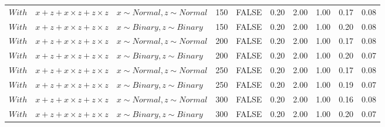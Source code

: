 \begin{longtable}{lllrlrrrrr}
  $With$ & $\textit{x} + \textit{z} + \textit{x} \times \textit{z} + \textit{z} \times \textit{z}$ & $\textit{x} \sim Normal , \textit{z} \sim Normal$ & 150 & FALSE & 0.20 & 2.00 & 1.00 & 0.17 & 0.08 \\ 
  $With$ & $\textit{x} + \textit{z} + \textit{x} \times \textit{z} + \textit{z} \times \textit{z}$ & $\textit{x} \sim Binary, \textit{z} \sim Binary$ & 150 & FALSE & 0.20 & 2.00 & 1.00 & 0.20 & 0.08 \\ 
  $With$ & $\textit{x} + \textit{z} + \textit{x} \times \textit{z} + \textit{z} \times \textit{z}$ & $\textit{x} \sim Normal , \textit{z} \sim Normal$ & 200 & FALSE & 0.20 & 2.00 & 1.00 & 0.17 & 0.08 \\ 
  $With$ & $\textit{x} + \textit{z} + \textit{x} \times \textit{z} + \textit{z} \times \textit{z}$ & $\textit{x} \sim Binary, \textit{z} \sim Binary$ & 200 & FALSE & 0.20 & 2.00 & 1.00 & 0.20 & 0.07 \\ 
  $With$ & $\textit{x} + \textit{z} + \textit{x} \times \textit{z} + \textit{z} \times \textit{z}$ & $\textit{x} \sim Normal , \textit{z} \sim Normal$ & 250 & FALSE & 0.20 & 2.00 & 1.00 & 0.17 & 0.08 \\ 
  $With$ & $\textit{x} + \textit{z} + \textit{x} \times \textit{z} + \textit{z} \times \textit{z}$ & $\textit{x} \sim Binary, \textit{z} \sim Binary$ & 250 & FALSE & 0.20 & 2.00 & 1.00 & 0.19 & 0.07 \\ 
  $With$ & $\textit{x} + \textit{z} + \textit{x} \times \textit{z} + \textit{z} \times \textit{z}$ & $\textit{x} \sim Normal , \textit{z} \sim Normal$ & 300 & FALSE & 0.20 & 2.00 & 1.00 & 0.16 & 0.08 \\ 
  $With$ & $\textit{x} + \textit{z} + \textit{x} \times \textit{z} + \textit{z} \times \textit{z}$ & $\textit{x} \sim Binary, \textit{z} \sim Binary$ & 300 & FALSE & 0.20 & 2.00 & 1.00 & 0.20 & 0.07 \\ 
   \hline
\hline

\end{longtable}
